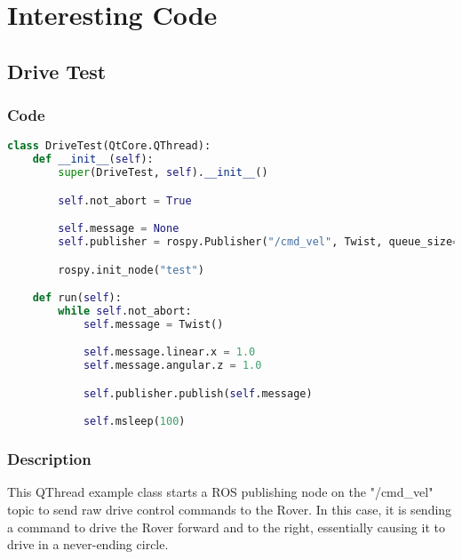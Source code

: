 
\section{Interesting Code}
\subsection{Drive Test}
\subsubsection{Code}
\begin{lstlisting}[language=python]
class DriveTest(QtCore.QThread):
    def __init__(self):
        super(DriveTest, self).__init__()

        self.not_abort = True

        self.message = None
        self.publisher = rospy.Publisher("/cmd_vel", Twist, queue_size=10)

        rospy.init_node("test")

    def run(self):
        while self.not_abort:
            self.message = Twist()

            self.message.linear.x = 1.0
            self.message.angular.z = 1.0

            self.publisher.publish(self.message)

            self.msleep(100)
\end{lstlisting}

\subsubsection{Description}
This QThread example class starts a ROS publishing node on the "/cmd\_vel" topic to send raw drive control commands to the Rover.
In this case, it is sending a command to drive the Rover forward and to the right, essentially causing it to drive in a never-ending circle.

